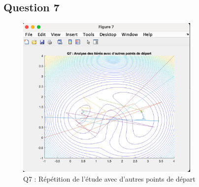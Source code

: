 \documentclass[12pt]{article}
\begin{document}
\subsection{Question 7}
\begin{figure}[H]
    \centering
    \includegraphics[width=0.8\textwidth]{Q7.png} 
    \caption{Q7 : Répétition de l'étude avec d'autres points de départ}
\end{figure}
\end{document}
